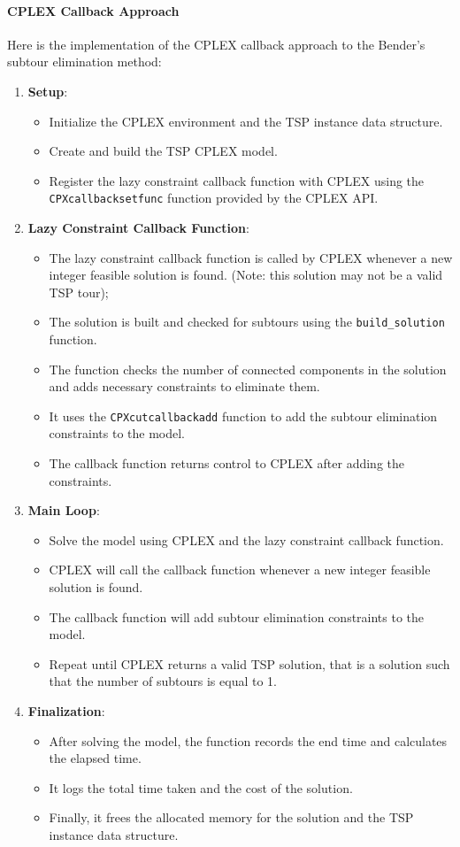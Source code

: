 \documentclass{article}
\begin{document}
\paragraph{CPLEX Callback Approach}
Here is the implementation of the CPLEX callback approach to the Bender's subtour elimination method:
\begin{enumerate}
	\item \textbf{Setup}:
	\begin{itemize}
		\item Initialize the CPLEX environment and the TSP instance data structure.
		\item Create and build the TSP CPLEX model.
		\item Register the lazy constraint callback function with CPLEX using the \texttt{CPXcallbacksetfunc} function provided by the CPLEX API.
	\end{itemize}

	\item \textbf{Lazy Constraint Callback Function}:
	\begin{itemize}
		\item The lazy constraint callback function is called by CPLEX whenever a new integer feasible solution is found. (Note: this solution may not be a valid TSP tour);
		\item The solution is built and checked for subtours using the \texttt{build\_solution} function.
		\item The function checks the number of connected components in the solution and adds necessary constraints to eliminate them.
		\item It uses the \texttt{CPXcutcallbackadd} function to add the subtour elimination constraints to the model.
		\item The callback function returns control to CPLEX after adding the constraints.
	\end{itemize}
	\item \textbf{Main Loop}:
	\begin{itemize}
		\item Solve the model using CPLEX and the lazy constraint callback function.
		\item CPLEX will call the callback function whenever a new integer feasible solution is found.
		\item The callback function will add subtour elimination constraints to the model.
		\item Repeat until CPLEX returns a valid TSP solution, that is a solution such that the number of subtours is equal to 1.
	\end{itemize}
	\item \textbf{Finalization}:
	\begin{itemize}
		\item After solving the model, the function records the end time and calculates the elapsed time.
		\item It logs the total time taken and the cost of the solution.
		\item Finally, it frees the allocated memory for the solution and the TSP instance data structure.
	\end{itemize}
\end{enumerate}
\end{document}
